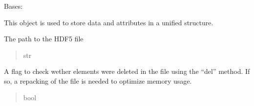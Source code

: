 \documentclass[letterpaper,10pt,english]{sphinxmanual}
\begin{document}
\begin{fulllineitems}
\label{\detokenize{source/HDF5_BLS:HDF5_BLS.wrapper.Wrapper}}
\pysigstartsignatures
\pysiglinewithargsret
{}
{}
{}
\pysigstopsignatures
\sphinxAtStartPar
Bases: 

\sphinxAtStartPar
This object is used to store data and attributes in a unified structure.

\begin{fulllineitems}
\label{\detokenize{source/HDF5_BLS:HDF5_BLS.wrapper.Wrapper.filepath}}
\pysigstartsignatures
\pysigline
{}
\pysigstopsignatures
\sphinxAtStartPar
The path to the HDF5 file
\begin{quote}\begin{description}
\sphinxAtStartPar
str

\end{description}\end{quote}

\end{fulllineitems}


\begin{fulllineitems}
\label{\detokenize{source/HDF5_BLS:HDF5_BLS.wrapper.Wrapper.need_for_repack}}
\pysigstartsignatures
\pysigline
{}
\pysigstopsignatures
\sphinxAtStartPar
A flag to check wether elements were deleted in the file using the “del” method. If so, a repacking of the file is needed to optimize memory usage.
\begin{quote}\begin{description}
\sphinxAtStartPar
bool

\end{description}\end{quote}

\end{fulllineitems}



\end{fulllineitems}
\end{document}
